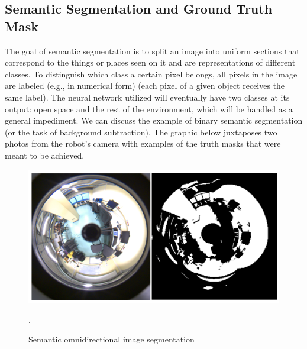 \documentclass[11pt, a4paper, openany]{book}
\begin{document}
\subsection{Semantic Segmentation and Ground Truth Mask}
The goal of semantic segmentation is to split an image into uniform sections that correspond to the things or places seen on it and are representations of different classes. To distinguish which class a certain pixel belongs, all pixels in the image are labeled (e.g., in numerical form) (each pixel of a given object receives the same label).
\newline
The neural network utilized will eventually have two classes at its output: open space and the rest of the environment, which will be handled as a general impediment. We can discuss the example of binary semantic segmentation (or the task of background subtraction).
The graphic below juxtaposes two photos from the robot's camera with examples of the truth masks that were meant to be achieved.
\begin{figure}[H]
    \centering
    \includegraphics[scale=1]{Labbot&ele/tf2.png}
    \caption{Semantic omnidirectional image segmentation}.
    \label{fig:print} 
\end{figure}
\end{document}

